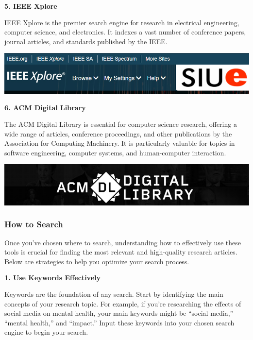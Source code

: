 \documentclass[
]{book}
\begin{document}
\textbf{5. IEEE Xplore}

IEEE Xplore is the premier search engine for research in electrical engineering, computer science, and electronics. It indexes a vast number of conference papers, journal articles, and standards published by the IEEE.

\href{https://ieeexplore.ieee.org/Xplore/home.jsp}{\includegraphics[width=1\linewidth,height=\textheight,keepaspectratio]{images/ieee-xplore.jpg}}

\textbf{6. ACM Digital Library}

The ACM Digital Library is essential for computer science research, offering a wide range of articles, conference proceedings, and other publications by the Association for Computing Machinery. It is particularly valuable for topics in software engineering, computer systems, and human-computer interaction.

\href{https://dl.acm.org/}{\includegraphics[width=1\linewidth,height=\textheight,keepaspectratio]{images/acm-digital-library.jpg}}

\subsubsection*{How to Search}\label{how-to-search}

Once you've chosen where to search, understanding how to effectively use these tools is crucial for finding the most relevant and high-quality research articles. Below are strategies to help you optimize your search process.

\textbf{1. Use Keywords Effectively}

Keywords are the foundation of any search. Start by identifying the main concepts of your research topic. For example, if you're researching the effects of social media on mental health, your main keywords might be ``social media,'' ``mental health,'' and ``impact.'' Input these keywords into your chosen search engine to begin your search.
\end{document}
